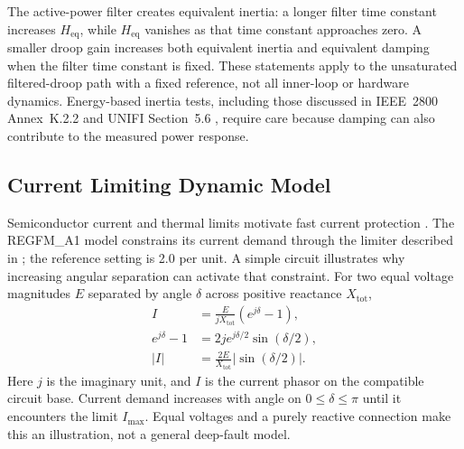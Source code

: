 \documentclass[11pt]{article}
\begin{document}
The active-power filter creates equivalent inertia: a longer filter time constant increases $H_{\mathrm{eq}}$, while $H_{\mathrm{eq}}$ vanishes as that time constant approaches zero. A smaller droop gain increases both equivalent inertia and equivalent damping when the filter time constant is fixed. These statements apply to the unsaturated filtered-droop path with a fixed reference, not all inner-loop or hardware dynamics. Energy-based inertia tests, including those discussed in IEEE~2800 Annex~K.2.2 and UNIFI Section~5.6 \cite{ieee2800,unifi2026}, require care because damping can also contribute to the measured power response.

\subsection{Current Limiting Dynamic Model}
\label{sec:limiter}
Semiconductor current and thermal limits motivate fast current protection \cite{iannuzzo2014}. The REGFM\_A1 model constrains its current demand through the limiter described in \cite{du2023a1}; the reference setting is 2.0 per unit. A simple circuit illustrates why increasing angular separation can activate that constraint. For two equal voltage magnitudes $E$ separated by angle $\delta$ across positive reactance $X_{\mathrm{tot}}$,
\begin{align}
I&=\frac{E}{jX_{\mathrm{tot}}}(e^{j\delta}-1),\nonumber\\
e^{j\delta}-1&=2j e^{j\delta/2}\sin(\delta/2),\nonumber\\
|I|&=\frac{2E}{X_{\mathrm{tot}}}|\sin(\delta/2)|.
\label{eq:idemand}
\end{align}
Here $j$ is the imaginary unit, and $I$ is the current phasor on the compatible circuit base. Current demand increases with angle on $0\leq\delta\leq\pi$ until it encounters the limit $I_{\mathrm{max}}$. Equal voltages and a purely reactive connection make this an illustration, not a general deep-fault model.
\end{document}
